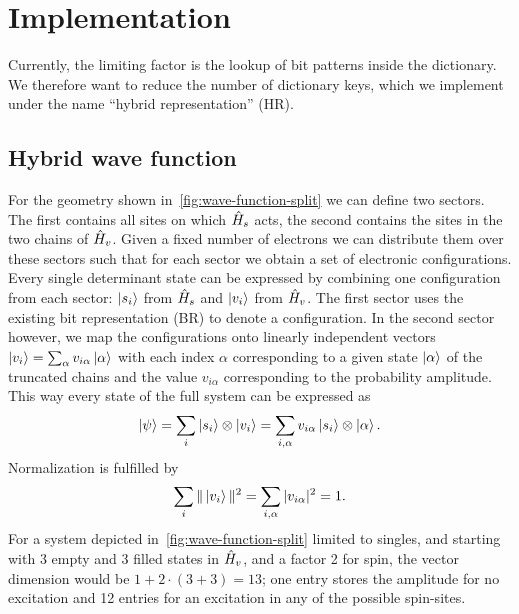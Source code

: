 \chapter{Implementation}

Currently,
the limiting factor is the lookup of bit patterns inside the dictionary.
We therefore want to reduce the number of dictionary keys,
which we implement under the name ``hybrid representation'' (HR).

\section{Hybrid wave function}

For the geometry shown in~\cref{fig:wave-function-split}
we can define two sectors.
The first contains all sites on which $\hat{H}_s$ acts,
the second contains the sites in the two chains of $\hat{H}_v$.
Given a fixed number of electrons
we can distribute them over these sectors such that
for each sector we obtain a set of electronic configurations.
Every single determinant state can be expressed
by combining one configuration from each sector:
$\ket{s_i}$ from $\hat{H}_s$ and $\ket{v_i}$ from $\hat{H}_v$.
The first sector uses the existing bit representation (BR)
to denote a configuration.
In the second sector however,
we map the configurations onto linearly independent vectors
$\ket{v_i} = \sum_\alpha v_{i\alpha} \ket{\alpha}$
with each index $\alpha$ corresponding to a given state $\ket{\alpha}$
of the truncated chains
and the value $v_{i\alpha}$ corresponding to the probability amplitude.
This way every state of the full system can be expressed as
\begin{equation}
    \ket{\psi} = \sum_i \ket{s_i} \otimes \ket{v_i}
    = \sum_{i, \alpha} v_{i\alpha} \ket{s_i} \otimes \ket{\alpha}.
\end{equation}
Normalization is fulfilled by
\begin{equation}
    \sum_i \|\ket{v_i}\|^2=\sum_{i, \alpha} |v_{i\alpha}|^2 = 1.
\end{equation}
For a system depicted in~\cref{fig:wave-function-split} limited to singles,
and starting with 3 empty and 3 filled states in $\hat{H}_v$,
and a factor 2 for spin,
the vector dimension would be $1+2\cdot(3+3) = 13$;
one entry stores the amplitude for no excitation
and 12 entries for an excitation in any of the possible spin-sites.

